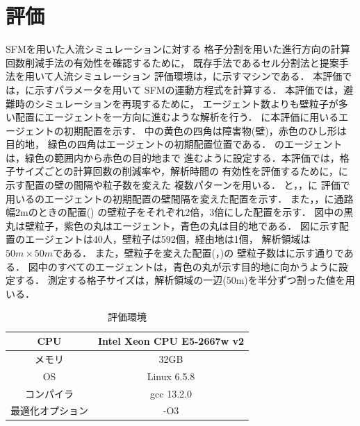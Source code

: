 \section{評価}
SFMを用いた人流シミュレーションに対する
格子分割を用いた進行方向の計算回数削減手法の有効性を確認するために，
既存手法であるセル分割法と提案手法を用いて人流シミュレーション
評価環境は，に示すマシンである．
本評価では，に示すパラメータを用いて
SFMの運動方程式を計算する．
本評価では，避難時のシミュレーションを再現するために，
エージェント数よりも壁粒子が多い配置にエージェントを一方向に進むような解析を行う．
に本評価に用いるエージェントの初期配置を示す．
中の黄色の四角は障害物(壁)，赤色のひし形は目的地，
緑色の四角はエージェントの初期配置位置である．
のエージェントは，緑色の範囲内から赤色の目的地まで
進むように設定する．本評価では，格子サイズごとの計算回数の削減率や，解析時間の
有効性を評価するために，に示す配置の壁の間隔や粒子数を変えた
複数パターンを用いる．
と，，に
評価で用いるのエージェントの初期配置の壁間隔を変えた配置を示す．
また，，に通路幅2mのときの配置()
の壁粒子をそれぞれ2倍，3倍にした配置を示す．
図中の黒丸は壁粒子，紫色の丸はエージェント，青色の丸は目的地である．
図に示す配置のエージェントは40人，壁粒子は592個，経由地は1個，
解析領域は$50m \times 50m$である．
また，壁粒子を変えた配置(，)の
壁粒子数はに示す通りである．
図中のすべてのエージェントは，青色の丸が示す目的地に向かうように設定する．
測定する格子サイズは，解析領域の一辺(50m)を半分ずつ割った値を用いる．

\begin{table}[t]
  \begin{center}
    \caption{評価環境}
      \label{tb:result_env}
      \begin{tabular}{c|c}
      \hline \hline
      CPU              & Intel Xeon CPU E5-2667w v2 \\ \hline
      メモリ           & 32GB                       \\ \hline
      OS               & Linux 6.5.8               \\ \hline
      コンパイラ       & gcc 13.2.0                  \\ \hline
      最適化オプション & -O3                        \\ \hline
    \end{tabular}
  \end{center}
\end{table}

